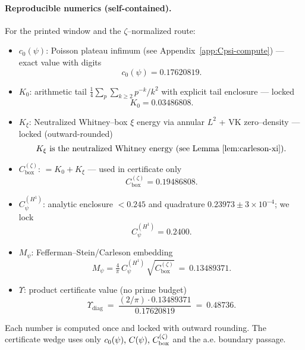 \documentclass[11pt]{article}
\providecommand{\czeroplateau}{0.17620819}%
\providecommand{\CboxZeta}{K_0 + K_\xi}%
\providecommand{\CpsiHone}{0.2400}%
\providecommand{\Mpsilocked}{(4/\pi)\,\CpsiHone\,\sqrt{\CboxZeta}}
\providecommand{\UpsilonLocked}{(2/\pi)\,\Mpsilocked/\czeroplateau}%
\renewcommand{\CboxZeta}{0.19486808}
\renewcommand{\Mpsilocked}{0.13489371}
\renewcommand{\UpsilonLocked}{0.48736}
\theoremstyle{definition}
\theoremstyle{remark}
\begin{document}
\paragraph{Reproducible numerics (self-contained).}
For the printed window and the \(\zeta\)–normalized route:
\begin{itemize}
\item \(c_0(\psi)\): Poisson plateau infimum (see Appendix~\ref{app:Cpsi-compute}) — exact value with digits
\[ c_0(\psi)=0.17620819. \]
\item \(K_0\): arithmetic tail \(\tfrac14\sum_{p}\sum_{k\ge2} p^{-k}/k^2\) with explicit tail enclosure — locked
\[ K_0=0.03486808. \]
\item \(K_\xi\): Neutralized Whitney–box \(\xi\) energy via annular $L^2$ + VK zero–density — locked (outward-rounded)
\[ K_\xi \text{ is the neutralized Whitney energy (see Lemma~\ref{lem:carleson-xi}).} \]
\item \(C_{\mathrm{box}}^{(\zeta)}\): $=K_0+K_\xi$ — used in certificate only
\[ C_{\mathrm{box}}^{(\zeta)}=\CboxZeta. \]
\item \(C_\psi^{(H^1)}\): analytic enclosure $<0.245$ and quadrature $0.23973\pm3\times10^{-4}$; we lock
\[ C_\psi^{(H^1)}=0.2400. \]
\item \(M_\psi\): Fefferman–Stein/Carleson embedding
\[ M_\psi=\tfrac{4}{\pi}\,C_\psi^{(H^1)}\,\sqrt{C_{\mathrm{box}}^{(\zeta)}}\ =\ \Mpsilocked. \]
\item \(\Upsilon\): product certificate value (no prime budget)
\[ \Upsilon_{\mathrm{diag}}\ =\ \frac{(2/\pi)\cdot \Mpsilocked}{0.17620819}\ =\ \UpsilonLocked. \]
\end{itemize}
Each number is computed once and locked with outward rounding. The certificate wedge uses only \(c_0(\psi),\,C(\psi),\,C_{\rm box}^{(\zeta)}\) and the a.e. boundary passage.





\vspace{1.0cm}
\end{document}
